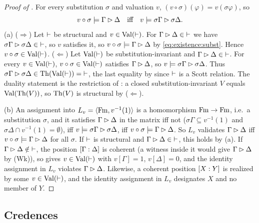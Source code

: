 \begin{proof}[Proof of ]
For every substitution $\sigma$ and valuation $v$, $(v\circ\sigma)(\varphi)=v(\sigma\varphi)$, so
\begin{equation}\label{eq:existence:subst}
v\circ\sigma\models\Gamma\rhd\Delta\quad\text{iff}\quad v\models\sigma\Gamma\rhd\sigma\Delta.
\end{equation}
(a) ($\Rightarrow$) Let ${\vdash}$ be structural and $v\in\mathrm{Val}(\vdash)$. For $\Gamma\rhd\Delta\in{\vdash}$ we have $\sigma\Gamma\rhd\sigma\Delta\in{\vdash}$, so $v$ satisfies it, so $v\circ\sigma\models\Gamma\rhd\Delta$ by \eqref{eq:existence:subst}. Hence $v\circ\sigma\in\mathrm{Val}(\vdash)$.
($\Leftarrow$) Let $\mathrm{Val}(\vdash)$ be substitution-invariant and $\Gamma\rhd\Delta\in{\vdash}$. For every $v\in\mathrm{Val}(\vdash)$, $v\circ\sigma\in\mathrm{Val}(\vdash)$ satisfies $\Gamma\rhd\Delta$, so $v\models\sigma\Gamma\rhd\sigma\Delta$. Thus $\sigma\Gamma\rhd\sigma\Delta\in\mathrm{Th}(\mathrm{Val}(\vdash))={\vdash}$, the last equality by  since ${\vdash}$ is a Scott relation.
The duality statement is the restriction of : a closed substitution-invariant $V$ equals $\mathrm{Val}(\mathrm{Th}(V))$, so $\mathrm{Th}(V)$ is structural by ($\Leftarrow$).

(b) An assignment into $L_v=\langle\mathrm{Fm},v^{-1}(1)\rangle$ is a homomorphism $\mathrm{Fm}\to\mathrm{Fm}$, i.e.\ a substitution $\sigma$, and it satisfies $\Gamma\rhd\Delta$ in the matrix iff not ($\sigma\Gamma\subseteq v^{-1}(1)$ and $\sigma\Delta\cap v^{-1}(1)=\emptyset$), iff $v\models\sigma\Gamma\rhd\sigma\Delta$, iff $v\circ\sigma\models\Gamma\rhd\Delta$. So $L_v$ validates $\Gamma\rhd\Delta$ iff $v\circ\sigma\models\Gamma\rhd\Delta$ for all $\sigma$. If ${\vdash}$ is structural and $\Gamma\rhd\Delta\in{\vdash}$, this holds by (a). If $\Gamma\rhd\Delta\notin{\vdash}$, the position $[\Gamma : \Delta]$ is coherent (a witness inside it would give $\Gamma\rhd\Delta$ by (Wk)), so  gives $v\in\mathrm{Val}(\vdash)$ with $v[\Gamma]=1$, $v[\Delta]=0$, and the identity assignment in $L_v$ violates $\Gamma\rhd\Delta$. Likewise, a coherent position $[X : Y]$ is realized by some $v\in\mathrm{Val}(\vdash)$, and the identity assignment in $L_v$ designates $X$ and no member of $Y$.
\end{proof}

\subsection{Credences}\label{app:existence:credences}

